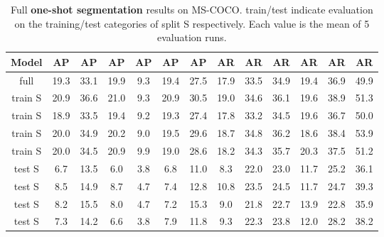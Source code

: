 \documentclass{article}
\newcommand{\coco}{MS-COCO\xspace}
\begin{document}
\begin{table}[h]
\begin{center}
\begin{small}
\begin{tabular}{c|ccc|ccc|ccc|ccc}
Model & AP & AP & AP & AP & AP & AP & AR & AR & AR & AR & AR & AR\\
\hline
full & 19.3 & 33.1 & 19.9 & 9.3 & 19.4 & 27.5 & 17.9 & 33.5 & 34.9 & 19.4 & 36.9 & 49.9 \\
\hline
train S & 20.9 & 36.6 & 21.0 & 9.3 & 20.9 & 30.5 & 19.0 & 34.6 & 36.1 & 19.6 & 38.9 & 51.3 \\
train S & 18.9 & 33.5 & 19.4 & 9.2 & 19.3 & 27.4 & 17.8 & 33.2 & 34.5 & 19.6 & 36.7 & 50.0 \\
train S & 20.0 & 34.9 & 20.2 & 9.0 & 19.5 & 29.6 & 18.7 & 34.8 & 36.2 & 18.6 & 38.4 & 53.9 \\
train S & 20.0 & 34.5 & 20.9 & 9.9 & 19.0 & 28.6 & 18.2 & 34.3 & 35.7 & 20.3 & 37.5 & 51.2 \\
\hline
test S & 6.7 & 13.5 & 6.0 & 3.8 & 6.8 & 11.0 & 8.3 & 22.0 & 23.0 & 11.7 & 25.2 & 36.1 \\
test S & 8.5 & 14.9 & 8.7 & 4.7 & 7.4 & 12.8 & 10.8 & 23.5 & 24.5 & 11.7 & 24.7 & 39.3 \\
test S & 8.2 & 15.5 & 8.0 & 4.7 & 7.2 & 15.3 & 9.0 & 21.8 & 22.7 & 13.9 & 22.8 & 35.9 \\
test S & 7.3 & 14.2 & 6.6 & 3.8 & 7.9 & 11.8 & 9.3 & 22.3 & 23.8 & 12.0 & 28.2 & 38.2
\end{tabular}
\end{small}
\end{center}
\caption{Full \textbf{one-shot segmentation} results on \coco. train/test indicate evaluation on the training/test categories of split S respectively. Each value is the mean of 5 evaluation runs.}
\vspace{-12pt}
\label{table:extended_one-shot_segmentation_results}
\end{table}
\end{document}
